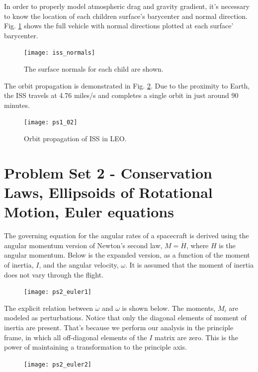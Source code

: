 \documentclass[12pt, letterpaper]{article}
\begin{document}
In order to properly model atmospheric drag and gravity gradient, it's necessary to know the location of each children surface's barycenter and normal direction. Fig. \ref{1:iss_normal} shows the full vehicle with normal directions plotted at each surface' barycenter.

\begin{figure}[H]
	\centering
	\texttt{[image: iss\_normals]}
	\caption{The surface normals for each child are shown.}
	\label{1:iss_normal}
\end{figure}



The orbit propagation is demonstrated in Fig. \ref{1:orbit2}. Due to the proximity to Earth, the ISS travels at 4.76 miles/s and completes a single orbit in just around 90 minutes.


\begin{figure}[H]
	\centering
	\texttt{[image: ps1\_02]}
	\caption{Orbit propagation of ISS in LEO.}
	\label{1:orbit2}
\end{figure}





\section{Problem Set 2 - Conservation Laws, Ellipsoids of Rotational Motion, Euler equations}

The governing equation for the angular rates of a spacecraft is derived using the angular momentum version of Newton's second law, $M = \dot{H}$, where $H$ is the angular momentum. Below is the expanded version, as a function of the moment of inertia, $I$, and the angular velocity, $\omega$. It is assumed that the moment of inertia does not vary through the flight.

\begin{figure}[H]
	\centering
	\texttt{[image: ps2\_euler1]}
\end{figure}

The explicit relation between $\dot{\omega}$ and $\omega$ is shown below. The moments, $M_i$ are modeled as perturbations. Notice that only the diagonal elements of moment of inertia are present. That's because we perform our analysis in the principle frame, in which all off-diagonal elements of the $I$ matrix are zero. This is the power of maintaining a transformation to the principle axis.

\begin{figure}[H]
	\centering
	\texttt{[image: ps2\_euler2]}
\end{figure}
\end{document}
